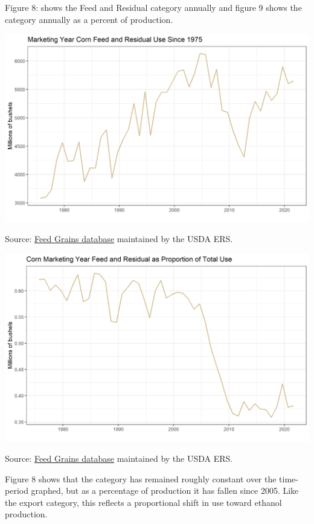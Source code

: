 \documentclass[
]{book}
\begin{document}
Figure 8: shows the Feed and Residual category annually and figure 9
shows the category annually as a percent of production.

\includegraphics{assets/ForecastingUseof-FeedandResidualMY.png}

Source: \href{http://www.ers.usda.gov/data-products/feed-grains-database/feed-grains-yearbook-tables.aspx\#26780}{Feed Grains
database}
maintained by the USDA ERS.

\includegraphics{assets/ForecastingUseof-CornUseCategoriesFeedandResidPropofUse.png}

Source: \href{http://www.ers.usda.gov/data-products/feed-grains-database/feed-grains-yearbook-tables.aspx\#26780}{Feed Grains
database}
maintained by the USDA ERS.

Figure 8 shows that the category has remained roughly constant over the
time-period graphed, but as a percentage of production it has fallen
since 2005. Like the export category, this reflects a proportional shift
in use toward ethanol production.
\end{document}
